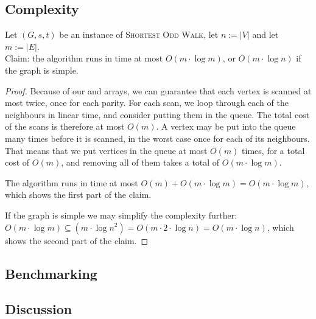 \subsection{Complexity}
Let $(G,s,t)$ be an instance of \textsc{Shortest Odd Walk}, let $n := |V|$ and let $m := |E|$.\\
Claim: the algorithm runs in time at most $O(m \cdot \log m)$, or $O(m \cdot \log n)$ if the graph is simple.
\begin{proof}
    Because of our  and  arrays, we can guarantee that each vertex is scanned at most twice, once for each parity. For each scan, we loop through each of the neighbours in linear time, and consider putting them in the queue. The total cost of the scans is therefore at most $O(m)$. A vertex may be put into the queue many times before it is scanned, in the worst case once for each of its neighbours. That means that we put vertices in the queue at most $O(m)$ times, for a total cost of $O(m)$, and removing all of them takes a total of $O(m \cdot \log m)$. 
    
    The algorithm runs in time at most $O(m) + O(m \cdot \log m) = O(m \cdot \log m)$, which shows the first part of the claim.
    
    If the graph is simple we may simplify the complexity further: $O(m \cdot \log m) \subseteq (m \cdot \log n^2) = O(m \cdot 2 \cdot \log n) = O(m \cdot \log n)$, which shows the second part of the claim.
\end{proof}

\subsection{Benchmarking}

\subsection{Discussion}
